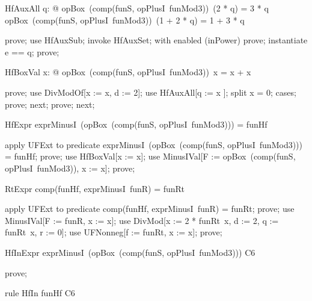 \documentclass{article}
\begin{document}
\begin{theorem}{HfAuxAll}
  \forall q: \nat @ opBox~(comp(funS, opPlusI~funMod3))~(2 * q) = 3 * q \land opBox~(comp(funS, opPlusI~funMod3))~(1 + 2 * q) = 1 + 3 * q
\end{theorem}

\begin{zproof}
prove;
use HfAuxSub;
invoke HfAuxSet;
with enabled (inPower) prove;
instantiate e == q;
prove;
\end{zproof}

\begin{theorem}{HfBoxVal}
  \forall x: \nat @ opBox~(comp(funS, opPlusI~funMod3))~x = x + x 
\end{theorem}

\begin{zproof}
prove;
use DivModOf[x := x, d := 2];
use HfAuxAll[q := x ];
split x  = 0;
cases;
prove;
next;
prove;
next;
\end{zproof}

\begin{theorem}{HfExpr}
  exprMinusI~(opBox~(comp(funS, opPlusI~funMod3))) = funHf
\end{theorem}

\begin{zproof}
apply UFExt to predicate exprMinusI~(opBox~(comp(funS, opPlusI~funMod3))) = funHf;
prove;
use HfBoxVal[x := x];
use MinusIVal[F := opBox~(comp(funS, opPlusI~funMod3)), x := x];
prove;
\end{zproof}

\begin{theorem}{RtExpr}
  comp(funHf, exprMinusI~funR) = funRt
\end{theorem}

\begin{zproof}
apply UFExt to predicate comp(funHf, exprMinusI~funR) = funRt;
prove;
use MinusIVal[F := funR, x := x];
use DivMod[x := 2 * funRt~x, d := 2, q := funRt~x, r := 0];
use UFNonneg[f := funRt, x := x];
prove;
\end{zproof}

\begin{theorem}{HfInExpr}
  exprMinusI~(opBox~(comp(funS, opPlusI~funMod3))) \in C6
\end{theorem}

\begin{zproof}
prove;
\end{zproof}

\begin{theorem}{rule HfIn}
  funHf \in C6
\end{theorem}
\end{document}
